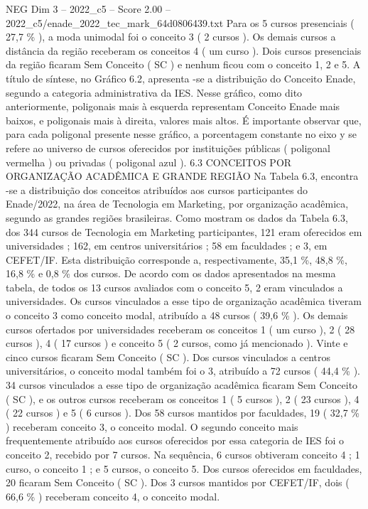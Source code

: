 \begin{textsample}{NEG Dim 3 – 2022\_c5 – Score 2.00 – 2022\_c5/enade\_2022\_tec\_mark\_64d0806439.txt}
Para os 5 cursos presenciais ( 27,7 \% ), a moda unimodal foi o conceito 3 ( 2 cursos ).
Os demais cursos a distância da região receberam os conceitos 4 ( um curso ).
Dois cursos presenciais da região ficaram Sem Conceito ( SC ) e nenhum ficou com o conceito 1, 2 e 5.
A título de síntese, no Gráfico 6.2, apresenta -se a distribuição do Conceito Enade, segundo a categoria administrativa da IES.
Nesse gráfico, como dito anteriormente, poligonais mais à esquerda representam Conceito Enade mais baixos, e poligonais mais à direita, valores mais altos.
É importante observar que, para cada poligonal presente nesse gráfico, a porcentagem constante no eixo y se refere ao universo de cursos oferecidos por instituições públicas ( poligonal vermelha ) ou privadas ( poligonal azul ). 6.3 CONCEITOS POR ORGANIZAÇÃO ACADÊMICA E GRANDE REGIÃO Na Tabela 6.3, encontra -se a distribuição dos conceitos atribuídos aos cursos participantes do Enade/2022, na área de Tecnologia em Marketing, por organização acadêmica, segundo as grandes regiões brasileiras.
Como mostram os dados da Tabela 6.3, dos 344 cursos de Tecnologia em Marketing participantes, 121 eram oferecidos em universidades ; 162, em centros universitários ; 58 em faculdades ; e 3, em CEFET/IF.
Esta distribuição corresponde a, respectivamente, 35,1 \%, 48,8 \%, 16,8 \% e 0,8 \% dos cursos.
De acordo com os dados apresentados na mesma tabela, de todos os 13 cursos avaliados com o conceito 5, 2 eram vinculados a universidades.
Os cursos vinculados a esse tipo de organização acadêmica tiveram o conceito 3 como conceito modal, atribuído a 48 cursos ( 39,6 \% ).
Os demais cursos ofertados por universidades receberam os conceitos 1 ( um curso ), 2 ( 28 cursos ), 4 ( 17 cursos ) e conceito 5 ( 2 cursos, como já mencionado ).
Vinte e cinco cursos ficaram Sem Conceito ( SC ).
Dos cursos vinculados a centros universitários, o conceito modal também foi o 3, atribuído a 72 cursos ( 44,4 \% ). 34 cursos vinculados a esse tipo de organização acadêmica ficaram Sem Conceito ( SC ), e os outros cursos receberam os conceitos 1 ( 5 cursos ), 2 ( 23 cursos ), 4 ( 22 cursos ) e 5 ( 6 cursos ).
Dos 58 cursos mantidos por faculdades, 19 ( 32,7 \% ) receberam conceito 3, o conceito modal.
O segundo conceito mais frequentemente atribuído aos cursos oferecidos por essa categoria de IES foi o conceito 2, recebido por 7 cursos.
Na sequência, 6 cursos obtiveram conceito 4 ; 1 curso, o conceito 1 ; e 5 cursos, o conceito 5.
Dos cursos oferecidos em faculdades, 20 ficaram Sem Conceito ( SC ).
Dos 3 cursos mantidos por CEFET/IF, dois ( 66,6 \% ) receberam conceito 4, o conceito modal.

\end{textsample}
